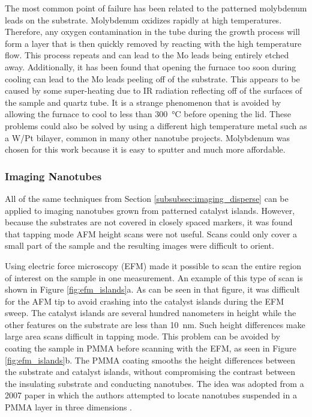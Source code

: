 The most common point of failure has been related to the patterned molybdenum leads on the substrate. Molybdenum oxidizes rapidly at high temperatures. Therefore, any oxygen contamination in the tube during the growth process will form a  layer that is then quickly removed by reacting with the high temperature  flow. This process repeats and can lead to the Mo leads being entirely etched away. Additionally, it has been found that opening the furnace too soon during cooling can lead to the Mo leads peeling off of the substrate. This appears to be caused by some super-heating due to IR radiation reflecting off of the surfaces of the sample and quartz tube. It is a strange phenomenon that is avoided by allowing the furnace to cool to less than \SI{300}{\degreeCelsius} before opening the lid. These problems could also be solved by using a different high temperature metal such as a W/Pt bilayer, common in many other nanotube projects. Molybdenum was chosen for this work because it is easy to sputter and much more affordable.

\subsubsection{Imaging Nanotubes}
\label{subsubsec:imaging_island}

All of the same techniques from Section \ref{subsubsec:imaging_disperse} can be applied to imaging nanotubes grown from patterned catalyst islands. However, because the substrates are not covered in closely spaced markers, it was found that tapping mode AFM height scans were not useful. Scans could only cover a small part of the sample and the resulting images were difficult to orient.

Using electric force microscopy (EFM) made it possible to scan the entire region of interest on the sample in one measurement. An example of this type of scan is shown in Figure \ref{fig:efm_islands}a. As can be seen in that figure, it was difficult for the AFM tip to avoid crashing into the catalyst islands during the EFM sweep. The catalyst islands are several hundred nanometers in height while the other features on the substrate are less than \SI{10}{\nano\meter}. Such height differences make large area scans difficult in tapping mode. This problem can be avoided by coating the sample in PMMA before scanning with the EFM, as seen in Figure \ref{fig:efm_islands}b. The PMMA coating smooths the height differences between the substrate and catalyst islands, without compromising the contrast between the insulating substrate and conducting nanotubes. The idea was adopted from a 2007 paper in which the authors attempted to locate nanotubes suspended in a PMMA layer in three dimensions \cite{Jespersen2007}.

